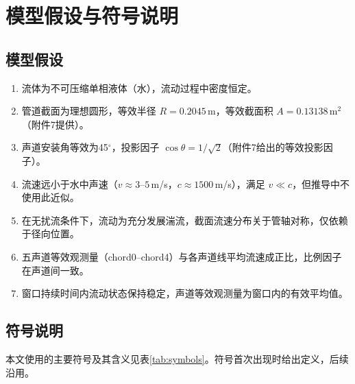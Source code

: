 \section{模型假设与符号说明}

\subsection{模型假设}

\begin{enumerate}
    \item 流体为不可压缩单相液体（水），流动过程中密度恒定。
    \item 管道截面为理想圆形，等效半径 $R = 0.2045$\,m，等效截面积 $A = 0.13138$\,m$^2$（附件7提供）。
    \item 声道安装角等效为45$^\circ$，投影因子 $\cos\theta = 1/\sqrt{2}$（附件7给出的等效投影因子）。
    \item 流速远小于水中声速（$v \approx 3$--$5$\,m/s，$c \approx 1500$\,m/s），满足 $v \ll c$，但推导中不使用此近似。
    \item 在无扰流条件下，流动为充分发展湍流，截面流速分布关于管轴对称，仅依赖于径向位置。
    \item 五声道等效观测量（chord0--chord4）与各声道线平均流速成正比，比例因子在声道间一致。
    \item 窗口持续时间内流动状态保持稳定，声道等效观测量为窗口内的有效平均值。
\end{enumerate}

\subsection{符号说明}

本文使用的主要符号及其含义见表\ref{tab:symbols}。符号首次出现时给出定义，后续沿用。


